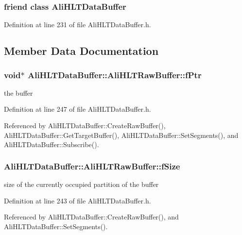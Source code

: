 \subsubsection{\setlength{\rightskip}{0pt plus 5cm}friend class {\bf Ali\-HLTData\-Buffer}\hspace{0.3cm}{\tt  [friend]}}\label{classAliHLTDataBuffer_1_1AliHLTRawBuffer_n0}




Definition at line 231 of file Ali\-HLTData\-Buffer.h.

\subsection{Member Data Documentation}
\subsubsection{\setlength{\rightskip}{0pt plus 5cm}void$\ast$ {\bf Ali\-HLTData\-Buffer::Ali\-HLTRaw\-Buffer::f\-Ptr}\hspace{0.3cm}{\tt  [private]}}\label{classAliHLTDataBuffer_1_1AliHLTRawBuffer_r2}


the buffer 

Definition at line 247 of file Ali\-HLTData\-Buffer.h.

Referenced by Ali\-HLTData\-Buffer::Create\-Raw\-Buffer(), Ali\-HLTData\-Buffer::Get\-Target\-Buffer(), Ali\-HLTData\-Buffer::Set\-Segments(), and Ali\-HLTData\-Buffer::Subscribe().
\subsubsection{ {\bf Ali\-HLTData\-Buffer::Ali\-HLTRaw\-Buffer::f\-Size}\hspace{0.3cm}{\tt  [private]}}\label{classAliHLTDataBuffer_1_1AliHLTRawBuffer_r0}


size of the currently occupied partition of the buffer 

Definition at line 243 of file Ali\-HLTData\-Buffer.h.

Referenced by Ali\-HLTData\-Buffer::Create\-Raw\-Buffer(), and Ali\-HLTData\-Buffer::Set\-Segments().
